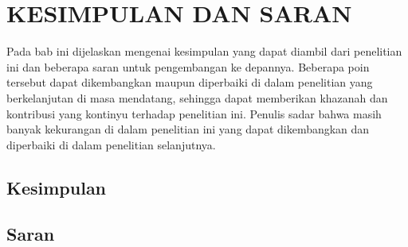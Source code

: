 %
%
%
%
%

\chapter{KESIMPULAN DAN SARAN}
\label{sec:kesimpulan-dan-saran}

Pada bab ini dijelaskan mengenai kesimpulan yang dapat diambil dari penelitian ini dan beberapa saran untuk pengembangan ke depannya. Beberapa poin tersebut dapat dikembangkan maupun diperbaiki di dalam penelitian yang berkelanjutan di masa mendatang, sehingga dapat memberikan khazanah dan kontribusi yang kontinyu terhadap penelitian ini. Penulis sadar bahwa masih banyak kekurangan di dalam penelitian ini yang dapat dikembangkan dan diperbaiki di dalam penelitian selanjutnya.

\section{Kesimpulan}

\blindtext

\section{Saran}

\blindtext
